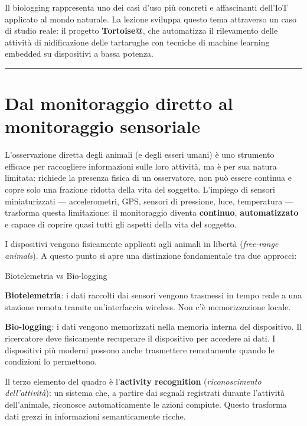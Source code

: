 \documentclass[
  italian,
  openany]{book}
\begin{document}
Il biologging rappresenta uno dei casi d'uso più concreti e affascinanti
dell'IoT applicato al mondo naturale. La lezione sviluppa questo tema
attraverso un caso di studio reale: il progetto \textbf{Tortoise@}, che
automatizza il rilevamento delle attività di nidificazione delle
tartarughe con tecniche di machine learning embedded su dispositivi a
bassa potenza.

\begin{center}\rule{0.5\linewidth}{0.5pt}\end{center}

\section{Dal monitoraggio diretto al monitoraggio
sensoriale}\label{dal-monitoraggio-diretto-al-monitoraggio-sensoriale}

L'osservazione diretta degli animali (e degli esseri umani) è uno
strumento efficace per raccogliere informazioni sulle loro attività, ma
è per sua natura limitata: richiede la presenza fisica di un
osservatore, non può essere continua e copre solo una frazione ridotta
della vita del soggetto. L'impiego di sensori miniaturizzati ---
accelerometri, GPS, sensori di pressione, luce, temperatura ---
trasforma questa limitazione: il monitoraggio diventa \textbf{continuo},
\textbf{automatizzato} e capace di coprire quasi tutti gli aspetti della
vita del soggetto.

I dispositivi vengono fisicamente applicati agli animali in libertà
(\emph{free-range animals}). A questo punto si apre una distinzione
fondamentale tra due approcci:

\begin{calloutdefinition}{Biotelemetria vs Bio-logging}

\textbf{Biotelemetria}: i dati raccolti dai sensori vengono trasmessi in
tempo reale a una stazione remota tramite un'interfaccia wireless. Non
c'è memorizzazione locale.

\textbf{Bio-logging}: i dati vengono memorizzati nella memoria interna
del dispositivo. Il ricercatore deve fisicamente recuperare il
dispositivo per accedere ai dati. I dispositivi più moderni possono
anche trasmettere remotamente quando le condizioni lo permettono.

\end{calloutdefinition}

Il terzo elemento del quadro è l'\textbf{activity recognition}
(\emph{riconoscimento dell'attività}): un sistema che, a partire dai
segnali registrati durante l'attività dell'animale, riconosce
automaticamente le azioni compiute. Questo trasforma dati grezzi in
informazioni semanticamente ricche.
\end{document}
